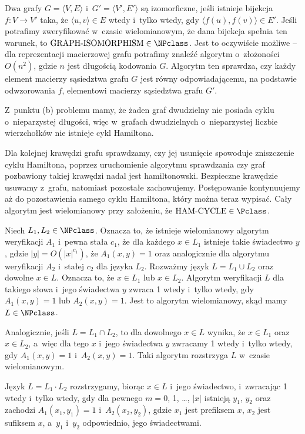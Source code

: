 
\exercise %
Dwa grafy $G=\langle V,E\rangle$ i~$G'=\langle V',E'\rangle$ są izomorficzne, jeśli istnieje bijekcja $f\colon V\to V'$ taka, że $\langle u,v\rangle\in E$ wtedy i~tylko wtedy, gdy $\langle f(u),f(v)\rangle\in E'$.
Jeśli potrafimy zweryfikować w~czasie wielomianowym, że dana bijekcja spełnia ten warunek, to $\text{GRAPH-ISOMORPHISM}\in\NPclass$.
Jest to oczywiście możliwe -- dla reprezentacji macierzowej grafu potrafimy znaleźć algorytm o~złożoności $O(n^2)$, gdzie $n$ jest długością kodowania $G$.
Algorytm ten sprawdza, czy każdy element macierzy sąsiedztwa grafu $G$ jest równy odpowiadającemu, na podstawie odwzorowania $f$, elementowi macierzy sąsiedztwa grafu $G'$.

\exercise %
Z~punktu (b) problemu  mamy, że żaden graf dwudzielny nie posiada cyklu o~nieparzystej długości, więc w~grafach dwudzielnych o~nieparzystej liczbie wierzchołków nie istnieje cykl Hamiltona.

\exercise %
Dla kolejnej krawędzi grafu sprawdzamy, czy jej usunięcie spowoduje zniszczenie cyklu Hamiltona, poprzez uruchomienie algorytmu sprawdzania czy graf pozbawiony takiej krawędzi nadal jest hamiltonowski.
Bezpieczne krawędzie usuwamy z~grafu, natomiast pozostałe zachowujemy.
Postępowanie kontynuujemy aż do pozostawienia samego cyklu Hamiltona, który można teraz wypisać.
Cały algorytm jest wielomianowy przy założeniu, że $\text{HAM-CYCLE}\in\Pclass$.

\exercise %
Niech $L_1,L_2\in\NPclass$.
Oznacza to, że istnieje wielomianowy algorytm weryfikacji $A_1$ i~pewna stała $c_1$, że dla każdego $x\in L_1$ istnieje takie świadectwo $y$, gdzie $|y|=O(|x|^{c_1})$, że $A_1(x,y)=1$ oraz analogicznie dla algorytmu weryfikacji $A_2$ i~stałej $c_2$ dla języka $L_2$.
Rozważmy język $L=L_1\cup L_2$ oraz dowolne $x\in L$.
Oznacza to, że $x\in L_1$ lub $x\in L_2$.
Algorytm weryfikacji $L$ dla takiego słowa i~jego świadectwa $y$ zwraca 1 wtedy i~tylko wtedy, gdy $A_1(x,y)=1$ lub $A_2(x,y)=1$.
Jest to algorytm wielomianowy, skąd mamy $L\in\NPclass$.

Analogicznie, jeśli $L=L_1\cap L_2$, to dla dowolnego $x\in L$ wynika, że $x\in L_1$ oraz $x\in L_2$, a~więc dla tego $x$ i~jego świadectwa $y$ zwracamy 1 wtedy i~tylko wtedy, gdy $A_1(x,y)=1$ i~$A_2(x,y)=1$.
Taki algorytm rozstrzyga $L$ w~czasie wielomianowym.

Język $L=L_1\cdot L_2$ rozstrzygamy, biorąc $x\in L$ i~jego świadectwo, i~zwracając 1 wtedy i~tylko wtedy, gdy dla pewnego $m=0$, 1, \dots, $|x|$ istnieją $y_1$, $y_2$ oraz zachodzi $A_1(x_1,y_1)=1$ i~$A_2(x_2,y_2)$, gdzie $x_1$ jest  prefiksem $x$, $x_2$ jest  sufiksem $x$, a~$y_1$ i~$y_2$ odpowiednio, jego świadectwami.

